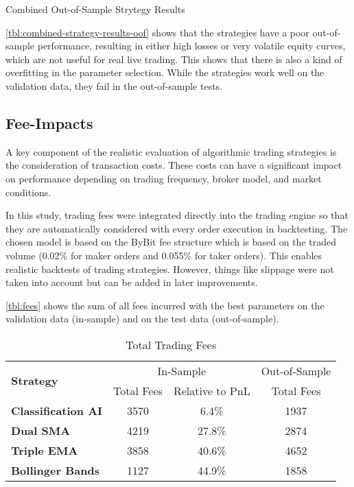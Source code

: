 \begin{table}[H]
    
    \caption{Combined Out-of-Sample Strytegy Results}
    \label{tbl:combined-strategy-results-oof}
\end{table}


\noindent
\autoref{tbl:combined-strategy-results-oof} shows that the strategies have a poor out-of-sample performance, resulting in either high losses or very volatile equity curves, which are not useful for real live trading.
This shows that there is also a kind of overfitting in the parameter selection.
While the strategies work well on the validation data, they fail in the out-of-sample tests.

\subsection{Fee-Impacts}

A key component of the realistic evaluation of algorithmic trading strategies is the consideration of transaction costs.
These costs can have a significant impact on performance depending on trading frequency, broker model, and market conditions.

In this study, trading fees were integrated directly into the trading engine so that they are automatically considered with every order execution in backtesting.
The chosen model is based on the ByBit fee structure which is based on the traded volume (0.02\% for maker orders and 0.055\% for taker orders).
This enables realistic backtests of trading strategies.
However, things like slippage were not taken into account but can be added in later improvements.

\autoref{tbl:fees} shows the sum of all fees incurred with the best parameters on the validation data (in-sample) and on the test data (out-of-sample).

\begin{table}[H]
    \centering
    \centering
    \begin{tabular}{l|ccc}
        \toprule
        \multirow{2}{*}{\textbf{Strategy}} & \multicolumn{2}{c}{In-Sample} & Out-of-Sample \\
        & Total Fees & Relative to PnL & Total Fees \\
        \midrule
        \textbf{Classification AI} & 3570       & 6.4\%           & 1937       \\
        \textbf{Dual SMA}          & 4219       & 27.8\%          & 2874       \\
        \textbf{Triple EMA}        & 3858       & 40.6\%          & 4652       \\
        \textbf{Bollinger Bands}   & 1127       & 44.9\%          & 1858       \\
        \bottomrule
    \end{tabular}
    \label{tbl:fees}
    \caption{Total Trading Fees}
\end{table}

